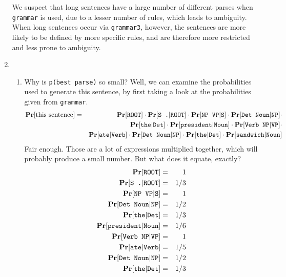 \documentclass[11pt]{article}
\newcommand{\prob}[1]{\ensuremath{\text{{\bf Pr}$\left[#1\right]$}}}
\newcommand{\code}[1]{\texttt{#1}}
\begin{document}
\begin{enumerate}
	We suspect that long sentences have a large number of different parses when \code{grammar} is used, due to a lesser number of rules, which leads to ambiguity. When long sentences occur via \code{grammar3}, however, the sentences are more likely to be defined by more specific rules, and are therefore more restricted and less prone to ambiguity.
\item
	\begin{enumerate}[label=(\roman*)]
	\item
		Why is \code{p(best parse)} so small? Well, we can examine the probabilities used to generate this sentence, by first taking a look at the probabilities given from \code{grammar}.
		\begin{eqnarray*}
			\prob{\text{this sentence}} &=&  \prob{\code{ROOT}} \cdot \prob{\code{S .} | \code{ROOT}} \cdot \prob{\code{NP VP} | \code{S}} \cdot \prob{\code{Det Noun} | \code{NP}} \cdot \\
			&& \prob{\code{the} | \code{Det}} \cdot \prob{\code{president} | \code{Noun}} \cdot \prob{\code{Verb NP} | \code{VP}} \cdot \\
			&& \prob{\code{ate} | \code{Verb}} \cdot \prob{\code{Det Noun} | \code{NP}} \cdot \prob{\code{the} | \code{Det}} \cdot \prob{\code{sandwich} | \code{Noun}}
		\end{eqnarray*}
		Fair enough. Those are a lot of expressions multiplied together, which will probably produce a small number. But what does it equate, exactly?
		\begin{eqnarray*}
			\prob{\code{ROOT}}             &=& 1 \\
			\prob{\code{S .} | \code{ROOT}} &=& 1/3 \\
                        	\prob{\code{NP VP} | \code{S}}        &=& 1 \\
                        	\prob{\code{Det Noun} | \code{NP}}    &=& 1/2 \\
                        	\prob{\code{the} | \code{Det}}        &=& 1/3 \\
                        	\prob{\code{president} | \code{Noun}} &=& 1/6 \\
                        	\prob{\code{Verb NP} | \code{VP}}     &=& 1 \\
                        	\prob{\code{ate} | \code{Verb}}      &=& 1/5 \\
                        	\prob{\code{Det Noun} | \code{NP}}    &=& 1/2 \\
                        	\prob{\code{the} | \code{Det}}        &=& 1/3 \\

\end{eqnarray*}
\end{enumerate}
\end{enumerate}
\end{document}
